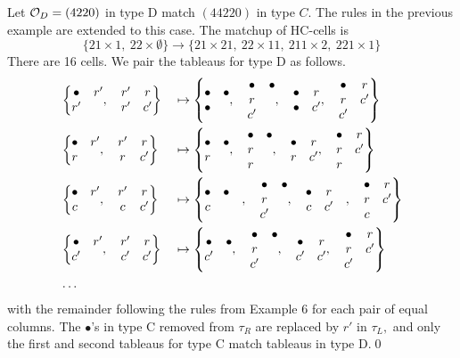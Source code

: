 \documentclass[11pt ,reqno]{amsart}
\begin{document}
\begin{example}
Let $\mathcal O_D=(4220)$ in type D match $(44220)$ in type $C$. The rules in
the previous example are extended to this case. The matchup of HC-cells is 
$$
\{ 21\times 1,\ 22\times \emptyset\}\longrightarrow \{21\times 21,\ 22\times 11,\ 211\times 2,\ 221\times 1\}
$$
There are 16 cells. We pair the tableaus for type D as follows.
$$
\begin{aligned}
&\left\{\begin{matrix}\bullet&r'\\r'&\end{matrix},\quad \begin{matrix}
r'&r\\r'&c'\end{matrix}\right\}&&\mapsto\left\{\begin{matrix}\bullet&\bullet\\\bullet
&\end{matrix},\quad\begin{matrix}\bullet&\bullet\\r&\\c'\end{matrix},\quad\begin{matrix}\bullet&r\\\bullet&c'\end{matrix},\quad \begin{matrix}\bullet&r\\r&c'\\c'&\end{matrix}\right\}\\
&\left\{\begin{matrix}\bullet&r'\\r&\end{matrix},\quad \begin{matrix} r'&r\\r&c'\end{matrix}\right\}
&&\mapsto\left\{\begin{matrix}\bullet&\bullet\\ r&\end{matrix},\quad
\begin{matrix}\bullet&\bullet\\r&\\ r&\end{matrix},\quad\begin{matrix}\bullet&r\\ r&c'\end{matrix},\quad \begin{matrix}\bullet&r\\r&c'\\r&\end{matrix}\right\}\\
&\left\{\begin{matrix}\bullet&r'\\c&\end{matrix},\quad \begin{matrix} r'&r\\c&c'\end{matrix}\right\}
&&\mapsto\left\{\begin{matrix}\bullet&\bullet\\ c&&\end{matrix},
\quad\begin{matrix}\bullet&\bullet\\r&\\c'&\end{matrix},\quad\begin{matrix}\bullet&r\\ c&c'&\end{matrix},\quad \begin{matrix}\bullet&r\\r&c'\\c&\end{matrix}\right\}\\
&\left\{\begin{matrix}\bullet&r'\\ c'&\end{matrix},\quad \begin{matrix} r'&r\\c'&c'\end{matrix}\right\}
&&\mapsto\left\{\begin{matrix}\bullet&\bullet\\c'
&\end{matrix},\quad\begin{matrix}\bullet&\bullet\\r&\\c'\end{matrix},\quad\begin{matrix}\bullet&r\\c'&c'\end{matrix},\quad
\begin{matrix}\bullet&r\\r&c'\\c'&\end{matrix}\right\}\\
&\dots &&
\end{aligned}
$$
with the remainder following the rules from Example 6 for each pair of
equal columns. The $\bullet$'s in type C removed from $\tau_R$ are replaced by
$r'$ in $\tau_L,$ and only the first and second tableaus for type C
match tableaus in type D.\hfill \qed

\end{example}
\end{document}
